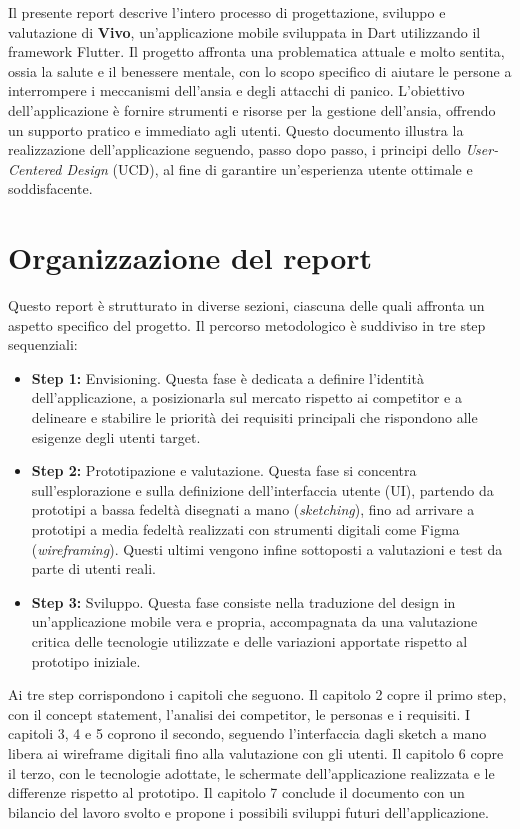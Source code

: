 Il presente report descrive l'intero processo di progettazione, sviluppo e valutazione di \textbf{Vivo}, un'applicazione mobile sviluppata in Dart utilizzando il framework Flutter.
Il progetto affronta una problematica attuale e molto sentita, ossia la salute e il benessere mentale, con lo scopo specifico di aiutare le persone a interrompere i meccanismi dell'ansia e degli attacchi di panico.
L'obiettivo dell'applicazione è fornire strumenti e risorse per la gestione dell'ansia, offrendo un supporto pratico e immediato agli utenti.
Questo documento illustra la realizzazione dell'applicazione seguendo, passo dopo passo, i principi dello \textit{User-Centered Design} (UCD), al fine di garantire un'esperienza utente ottimale e soddisfacente.

\section{Organizzazione del report}
\label{sec:organizzazione-del-report}

Questo report è strutturato in diverse sezioni, ciascuna delle quali affronta un aspetto specifico del progetto.
Il percorso metodologico è suddiviso in tre step sequenziali:

\begin{itemize}
    \item \textbf{Step 1:} Envisioning. Questa fase è dedicata a definire l'identità dell'applicazione, a posizionarla sul mercato rispetto ai competitor e a delineare e stabilire le priorità dei requisiti principali che rispondono alle esigenze degli utenti target.
    \item \textbf{Step 2:} Prototipazione e valutazione. Questa fase si concentra sull'esplorazione e sulla definizione dell'interfaccia utente (UI), partendo da prototipi a bassa fedeltà disegnati a mano (\textit{sketching}), fino ad arrivare a prototipi a media fedeltà realizzati con strumenti digitali come Figma (\textit{wireframing}). Questi ultimi vengono infine sottoposti a valutazioni e test da parte di utenti reali.
    \item \textbf{Step 3:} Sviluppo. Questa fase consiste nella traduzione del design in un'applicazione mobile vera e propria, accompagnata da una valutazione critica delle tecnologie utilizzate e delle variazioni apportate rispetto al prototipo iniziale.
\end{itemize}

Ai tre step corrispondono i capitoli che seguono.
Il capitolo 2 copre il primo step, con il concept statement, l'analisi dei competitor, le personas e i requisiti.
I capitoli 3, 4 e 5 coprono il secondo, seguendo l'interfaccia dagli sketch a mano libera ai wireframe digitali fino alla valutazione con gli utenti.
Il capitolo 6 copre il terzo, con le tecnologie adottate, le schermate dell'applicazione realizzata e le differenze rispetto al prototipo.
Il capitolo 7 conclude il documento con un bilancio del lavoro svolto e propone i possibili sviluppi futuri dell'applicazione.

